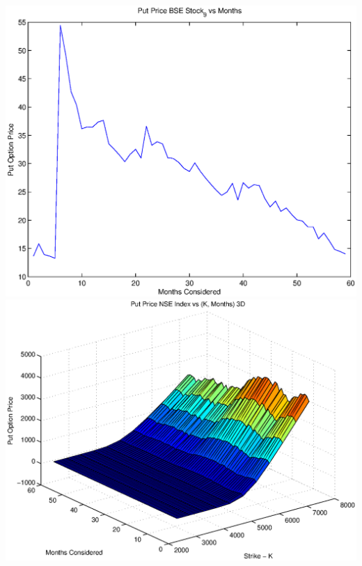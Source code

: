 \documentclass{article}
\begin{document}
\includegraphics[width=\textwidth]{Put_Price_BSE_Stock_9_vs_Months} \\

\includegraphics[width=\textwidth]{Put_Price_NSE_Index_vs_(K,_Months)_3D} \\
\end{document}
